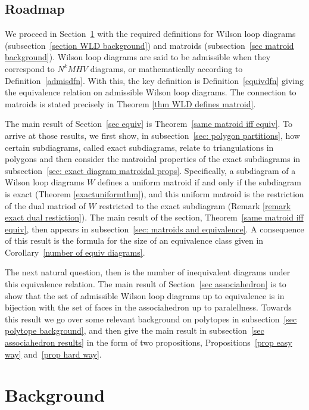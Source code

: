 \documentclass[11pt]{article}
\theoremstyle{remark}
\theoremstyle{definition}
\begin{document}
\subsection{Roadmap}

We proceed in Section~\ref{section overall background} with the required definitions for Wilson loop diagrams (subsection~\ref{section WLD background}) and matroids (subsection~\ref{sec matroid background}).  Wilson loop diagrams  are said to be admissible when they correspond to $N^kMHV$ diagrams, or mathematically according to Definition~\ref{admisdfn}.  With this, the key definition is Definition~\ref{equivdfn} giving the equivalence relation on admissible Wilson loop diagrams.  The connection to matroids is stated precisely in Theorem \ref{thm WLD defines matroid}.

The main result of Section~\ref{sec equiv} is Theorem~\ref{same matroid iff equiv}.  To arrive at those results, we first show, in subsection~\ref{sec: polygon partitions}, how certain subdiagrams, called exact subdiagrams, relate to triangulations in polygons and then consider the matroidal properties of the exact subdiagrams in subsection~\ref{sec: exact diagram matroidal props}.  Specifically, a subdiagram of a Wilson loop diagrams $W$ defines a uniform matroid if and only if the subdiagram is exact (Theorem \ref{exactuniformthm}), and this uniform matroid is the restriction of the dual matriod of $W$ restricted to the exact subdiagram (Remark \ref{remark exact dual restiction}).  The main result of the section, Theorem~\ref{same matroid iff equiv}, then appears in subsection~\ref{sec: matroids and equivalence}.  A consequence of this result is the formula for the size of an equivalence class given in Corollary~\ref{number of equiv diagrams}.

The next natural question, then is the number of inequivalent diagrams under this equivalence relation.  The main result of Section~\ref{sec associahedron} is to show that the set of admissible Wilson loop diagrams up to equivalence is in bijection with the set of faces in the associahedron up to paralellness.  Towards this result we go over some relevant background on polytopes in subsection~\ref{sec polytope background}, and then give the main result in subsection~\ref{sec associahedron results} in the form of two propositions, Propositions~\ref{prop easy way} and~\ref{prop hard way}.

\section{Background}\label{section overall background}
\end{document}
